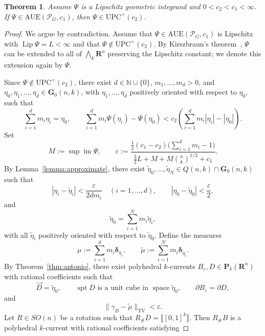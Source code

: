 \documentclass[a4paper,twoside,reqno]{article}
\theoremstyle{definition}
\theoremstyle{remark}
\theoremstyle{plain}
\newtheorem{theorem}{Theorem}[section]
\theoremstyle{remark}
\theoremstyle{definition}
\newcommand{\ograss}[2]{\mathbf{G}_0(#1,#2)}
\newcommand{\PC}[1]{\mathbf{P}_{#1}}
\newcommand{\natp}{\mathbb{N}}
\newcommand{\nat}{\natp \cup \{0\}}
\newcommand{\UPC}{\mathrm{UPC}}
\newcommand{\AUE}{\mathrm{AUE}}
\newcommand{\R}{\mathbf{R}}
\newcommand{\tbwedge}{{\textstyle \boldsymbol{\bigwedge}}}
\newcommand{\Dirac}[1]{\boldsymbol{\delta}_{#1}}
\DeclareMathOperator{\asssp}{space}
\DeclareMathOperator{\spt}{spt}
\DeclareMathOperator{\Lip}{Lip}
\DeclareMathOperator{\im}{im}
\begin{document}
\begin{theorem}
    \label{thm:main2}
    Assume $\Psi$ is a Lipschitz geometric integrand and 
    $0 < c_{2} < c_{1} < \infty$. If 
    $\Psi \in \AUE(\mathcal{P}_G, c_{1})$, then 
    $\Psi \in \UPC^{+}(c_{2})$.
\end{theorem}

\begin{proof}
    We argue by contradiction. Assume that 
    $\Psi \in \AUE(\mathcal{P}_G, c_{1})$ is Lipschitz with 
    $\Lip \Psi = L < \infty$ and that $\Psi \notin \UPC^{+}(c_{2})$.
    By Kirszbraun's theorem~\cite[2.10.43]{Federer1969}, $\Psi$ can be extended 
    to all of $\tbwedge_k \R^n$ preserving the Lipschitz constant; we 
    denote this extension again by $\Psi$.

    Since $\Psi \notin \UPC^{+}(c_{2})$, there exist $d \in \nat$,
    $m_1, \dots, m_d > 0$, and $\eta_0, \eta_1, \dots, \eta_d \in \ograss nk$, with
    $\eta_1, \dots, \eta_d$ positively oriented with respect to $\eta_0$, such that
    \[
        \sum_{i=1}^d m_i \eta_i = \eta_0,
        \qquad
        \sum_{i=1}^d m_i \Psi(\eta_i) - \Psi(\eta_0)
        < c_2 \left( \sum_{i=1}^d m_i |\eta_i| - |\eta_0| \right).
    \]
    Set
    \[
        M := \sup \im \Psi, \qquad
        \varepsilon :=
        \frac{\frac12 (c_1 - c_2)\bigl(\sum_{i=1}^d m_i - 1\bigr)}
        {\frac32 L + M + M \binom{n}{k}^{1/2} + c_1}.
    \]
    By Lemma~\ref{lemma:approximate}, there exist
    $\tilde{\eta}_0, \dots, \tilde{\eta}_{N} \in Q(n,k) \cap \ograss nk$ such that
    \[
        |\eta_i - \tilde{\eta}_i| < \frac{\varepsilon}{2 d m_i} \quad (i=1,\dots,d), \qquad
        |\eta_0 - \tilde{\eta}_0| < \frac{\varepsilon}{2},
    \]
    and
    \[
        \tilde{\eta}_0 = \sum_{i=1}^{N} m_i \tilde{\eta}_i,
    \]
    with all $\tilde{\eta}_i$ positively oriented with respect to $\tilde{\eta}_0$.
    Define the measures
    \[
        \mu := \sum_{i=1}^d m_i \Dirac{\eta_i},
        \qquad
        \tilde{\mu} := \sum_{i=1}^{N} m_i \Dirac{\tilde{\eta}_i}.
    \]
    By Theorem~\ref{thm:antonio}, there exist polyhedral $k$-currents
    $B_\varepsilon, D \in \PC{k}(\R^n)$ with rational coefficients such 
    that
    \[
        \vec{D} = \tilde{\eta}_0, \qquad
        \spt D \text{ is a unit cube in } \asssp \tilde{\eta}_0, \qquad
        \partial B_\varepsilon = \partial D,
    \]
    and
    \[
        \|\gamma_B - \tilde{\mu}\|_{\mathrm{TV}} < \varepsilon.
    \]
    Let $R \in SO(n)$ be a rotation such that $R_{\#} D = \llbracket [0,1]^k \rrbracket$.
    Then $R_{\#} B$ is a polyhedral $k$-current with rational coefficients satisfying

\end{proof}
\end{document}
